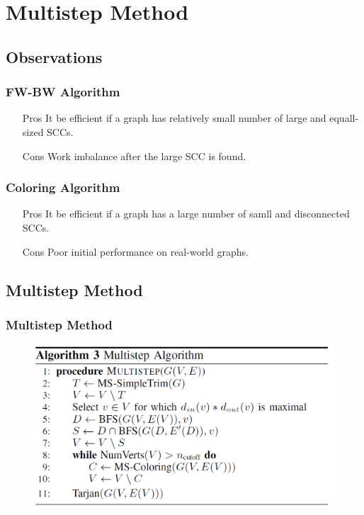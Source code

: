 \section{Multistep Method}

\subsection{Observations}
\begin{frame}
	\frametitle{FW-BW Algorithm}
	\begin{itemize}
		\setlength\itemsep{1em}
		\item[Pros] It be efficient if a graph has relatively small number 
			of large and equall-sized SCCs.
		\item[Cons] Work imbalance after the large SCC is found.
	\end{itemize}
\end{frame}

\begin{frame}
	\frametitle{Coloring Algorithm}
	\begin{itemize}
		\setlength\itemsep{1em}
		\item[Pros] It be efficient if a graph has a large number of samll
			and disconnected SCCs.
		\item[Cons] Poor initial performance on real-world graphs.
	\end{itemize}
\end{frame}

\subsection{Multistep Method}
\begin{frame}
	\frametitle{Multistep Method}
	\begin{figure}
		\includegraphics[scale=0.30]{figure/fig-Multistep.png}
	\end{figure}
\end{frame}

